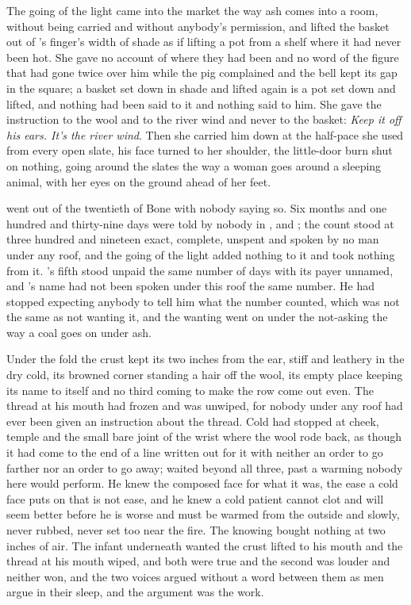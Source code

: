 The going of the light came into the market the way ash comes into a room, without being carried and without anybody's permission, and  lifted the basket out of 's finger's width of shade as if lifting a pot from a shelf where it had never been hot. She gave no account of where they had been and no word of the figure that had gone twice over him while the pig complained and the bell kept its gap in the square; a basket set down in shade and lifted again is a pot set down and lifted, and nothing had been said to it and nothing said to him. She gave the instruction to the wool and to the river wind and never to the basket: \emph{Keep it off his ears. It's the river wind}. Then she carried him down  at the half-pace she used from every open slate, his face turned to her shoulder, the little-door burn shut on nothing, going around the slates the way a woman goes around a sleeping animal, with her eyes on the ground ahead of her feet.

 went out of the twentieth of Bone with nobody saying so. Six months and one hundred and thirty-nine days were told by nobody in ,  and ; the count stood at three hundred and nineteen exact, complete, unspent and spoken by no man under any roof, and the going of the light added nothing to it and took nothing from it. 's fifth stood unpaid the same number of days with its payer unnamed, and 's name had not been spoken under this roof the same number. He had stopped expecting anybody to tell him what the number counted, which was not the same as not wanting it, and the wanting went on under the not-asking the way a coal goes on under ash.

Under the fold the crust kept its two inches from the ear, stiff and leathery in the dry cold, its browned corner standing a hair off the wool, its empty place keeping its name to itself and no third coming to make the row come out even. The thread at his mouth had frozen and was unwiped, for nobody under any roof had ever been given an instruction about the thread. Cold had stopped at cheek, temple and the small bare joint of the wrist where the wool rode back, as though it had come to the end of a line written out for it with neither an order to go farther nor an order to go away;  waited beyond all three, past a warming nobody here would perform. He knew the composed face for what it was, the ease a cold face puts on that is not ease, and he knew a cold patient cannot clot and will seem better before he is worse and must be warmed from the outside and slowly, never rubbed, never set too near the fire. The knowing bought nothing at two inches of air. The infant underneath wanted the crust lifted to his mouth and the thread at his mouth wiped, and both were true and the second was louder and neither won, and the two voices argued without a word between them as men argue in their sleep, and the argument was the work.

